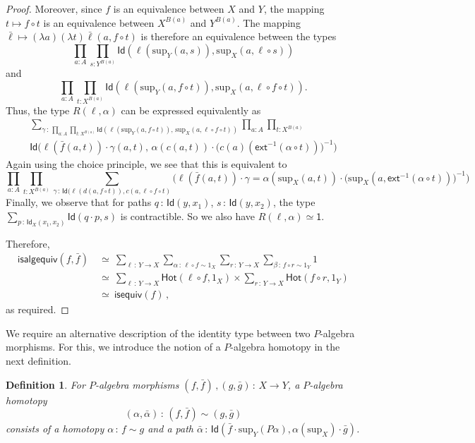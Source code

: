 \documentclass[10pt,a4paper,oneside,reqno]{amsart}
\theoremstyle{mythm}
\theoremstyle{mydef}
\newtheorem{definition}[theorem]{Definition}
\theoremstyle{myrmk}
\newcommand{\co}{\,{:}\,}
\newcommand{\com}{\circ}
\newcommand{\ct}{\cdot}
\newcommand{\isequiv}{\mathsf{isequiv}}
\newcommand{\Hot}{\mathsf{Hot}}
\newcommand{\ext}{\mathsf{ext}}
\newcommand{\one}{\mathsf{1}}
\newcommand{\Id}{\mathsf{Id}}
\renewcommand{\sup}{\mathrm{sup}}
\newcommand{\isalgequiv}{\mathsf{isalgequiv}}
\begin{document}
\begin{proof}
Moreover, since $f$ is an equivalence between $X$ and $Y$, the mapping $t \mapsto f \com t$ is an equivalence between $X^{B(a)}$ and $Y^{B(a)}$. The mapping $\bar{\ell} \mapsto (\lambda a) (\lambda t) \bar{\ell}(a,f \com t)$ is therefore an equivalence between the types $$\prod_{a:A}\prod_{s: Y^{B(a)}}\Id(\ell(\sup_Y(a,s)), \sup_X(a,\ell \com s))$$ and $$ \prod_{a:A}\prod_{t: X^{B(a)}} \Id(\ell(\sup_Y(a,f \com t)), \sup_X(a,\ell \com f \com t)).$$ 
Thus, the type $R(\ell,\alpha)$ can be expressed equivalently as
\[
\begin{split}
\sum_{\gamma \co \prod_{a:A}\prod_{t: X^{B(a)}} \Id(\ell(\sup_Y(a,f \circ t)),\, \sup_X(a,\ell \circ f \circ t))}
	 \prod_{a:A}\prod_{t: X^{B(a)}}\\
	\Id\big(\ell(\bar{f}(a,t)) \ct \gamma(a,t),\, \alpha(c(a,t)) \ct \big(c(a)(\ext^{-1}(\alpha \circ t))\big)^{-1}\big)
\end{split}
\]
Again using the choice principle, we see that this is equivalent to
\[ 
 \prod_{a:A}\prod_{t: X^{B(a)}}
 \sum_{\gamma \co \Id(\ell(d(a,f \circ t)), c(a,\ell \circ f \circ t)}
  \big(\ell(\bar{f}(a,t)) \ct \gamma = \alpha(\sup_X(a,t)) \ct \big(\sup_X(a, \ext^{-1}(\alpha \circ t))\big)^{-1}\big) 
  \]
Finally, we observe that for paths $q \co \Id(y,x_1)$, $s \co \Id(y,x_2)$, the type $\sum_{ p \co \Id_X(x_1,x_2)} \Id(q \ct p,s)$ is contractible. So we also have $R(\ell,\alpha) \simeq \one$. 

Therefore,
\begin{align*} 
\isalgequiv(f,\bar{f})\ 
  & \simeq\  \sum_{\ell \co Y \to X} \sum_{ \alpha \co \ell \com f \sim 1_X} \sum_{ r  \co Y \to X}
\sum_{\beta \co f \com r \sim 1_Y} 1 \\
 & \simeq\ \sum_{\ell \co Y \to X} \Hot( \ell \com f,1_X )\times 
		\sum_{r  \co Y \to X} \Hot( f \com r, 1_Y)  \\
 & \simeq\ \isequiv(f) \, ,
\end{align*} 
as required.
\end{proof}







We require an alternative description of the identity type between two $P$-algebra morphisms. For this, we introduce 
the notion of a $P$-algebra homotopy in the next definition.


\begin{definition}
For $P$-algebra morphisms $(f, \bar{f}) \, , (g, \bar{g}) \co X \to Y$, a \emph{$P$-algebra homotopy}  
\[
(\alpha, \bar{\alpha}) \co (f, \bar{f}) \sim (g, \bar{g})
\] 
consists of a homotopy $\alpha \co f \sim g$ and a path
$\bar{\alpha} \co \Id( \bar{f} \cdot \sup_Y (P \alpha) ,  \alpha(\sup_X)\cdot \bar{g})$. 
\end{definition}
\end{document}
